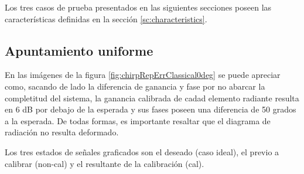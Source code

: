 Los tres casos de prueba presentados en las siguientes secciones poseen las características definidas en la sección
\ref{sc:characteristics}.


\subsection{Apuntamiento uniforme}

En las imágenes de la figura \ref{fig:chirpRepErrClassical0deg} se puede apreciar como, sacando de lado la diferencia de 
ganancia y fase por no abarcar la completitud del sistema, la ganancia calibrada de cadad elemento radiante resulta en 6 dB
por debajo de la esperada y sus fases poseen una diferencia de 50 grados a la esperada. De todas formas, es importante resaltar
que el diagrama de radiación no resulta deformado. 

Los tres estados de señales graficados son el deseado (caso ideal), el previo a calibrar (non-cal) y el resultante de la
calibración (cal).

